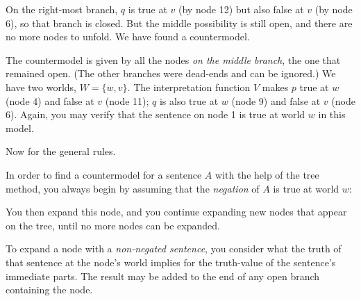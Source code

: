 \begin{center}
\end{center}
%
On the right-most branch, $q$ is true at $v$ (by node 12) but also false at $v$
(by node 6), so that branch is closed. But the middle possibility is still open,
and there are no more nodes to unfold. We have found a countermodel.

The countermodel is given by all the nodes \emph{on the middle branch},
the one that remained open. (The other branches were dead-ends and can be
ignored.) We have two worlds, $W = \{ w,v \}$. The interpretation function $V$
makes $p$ true at $w$ (node 4) and false at $v$ (node 11); $q$ is also true at
$w$ (node 9) and false at $v$ (node 6). Again, you may verify that the sentence
on node 1 is true at world $w$ in this model.

Now for the general rules.

In order to find a countermodel for a sentence $A$ with the help of the tree
method, you always begin by assuming that the \emph{negation} of $A$ is true at
world $w$:
%
\begin{center}
\end{center}
%
You then expand this node, and you continue expanding new nodes that appear on
the tree, until no more nodes can be expanded.

To expand a node with a \emph{non-negated sentence}, you consider what the truth of that
sentence at the node's world implies for the truth-value of the sentence's
immediate parts. The result may be added to the end of any open branch
containing the node.

